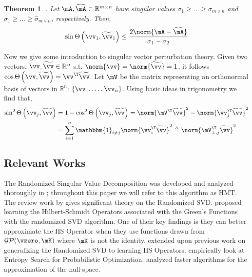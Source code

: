 \documentclass[10pt]{article}
\theoremstyle{plain}
\newtheorem{theorem}{Theorem}
\theoremstyle{definition}
\theoremstyle{remark}
\begin{document}
\begin{theorem}\label{thm:modified-wedin}
	\cite{orourke:2018}. Let $\mA,\widehat{\mA} \in \mathbb{R}^{m \times n}$ have singular values $\sigma_1 \geq \ldots \geq \sigma_{m \lor n}$ and $\widehat{\sigma}_1 \geq \ldots \geq \widehat{\sigma}_{m \lor n}$, respectively. Then,
	\begin{equation}
		\sin\Theta\left(\vv_1,\widetilde{\vv}_1\right) \leq \frac{2\norm{\mA - \widehat{\mA}}}{\sigma_1 - \sigma_2}
	\end{equation}
\end{theorem}
Now we give some introduction to singular vector perturbation theory. Given two vectors, $\vv, \widetilde{\vv} \in \mathbb{R}^{n}$ s.t. $\norm{\vv} = \norm{\widetilde{\vv}} = 1$, it follows $\cos\Theta\left(\vv, \widetilde{\vv}\right) = \vv^{\T}\widetilde{\vv}$. Let $\mV$ be the matrix representing an orthonormal basis of vectors in $\mathbb{R}^n$: $\left\{\vv_1,\ldots,\vv_n\right\}$. Using basic ideas in trigonometry we find that,
\begin{equation}
	\begin{aligned}
	\sin^2\Theta\left(\vv_j,\widetilde{\vv}\right) &= 1 - \cos^2\Theta\left(\vv_j, \widetilde{\vv}\right) = \norm{\mV^{\T}\widetilde{\vv}}^2 - \norm{\vv_j^{\T}\widetilde{\vv}}^2 \\
	&= \sum_{i = 1}^n \mathbbm{1}_{i \neq j} \norm{\vv_i^{\T}\widetilde{\vv}}^2 \triangleq \norm{\mV_{\perp,j}^{\T}\widetilde{\vv}}^2 \label{eq:sin-identity}
	\end{aligned}
\end{equation}

\subsection{Relevant Works}
The Randomized Singular Value Decomposition was developed and analyzed thoroughly in \cite{halko:2011}; throughout this paper we will refer to this algorithm as HMT. 
The review work by \cite{martinsson:2020} gives significant theory on the Randomized SVD. 
\cite{boulle:2022} proposed learning the Hilbert-Schmidt Operators associated with the Green's Functions with the randomized SVD algorithm. One of their key findings is they can better approximate the HS Operator when they use functions drawn from $\mathcal{GP}(\vzero, \mK)$ where $\mK$ is not the identity.
\cite{boulle:2023} extended upon previous work on generalizing the Randomized SVD to learning HS Operators. \cite{hennig:2012} empirically look at Entropy Search for Probabilistic Optimization. \cite{park:2023} analyzed faster algorithms for the approximation of the null-space.
\end{document}
